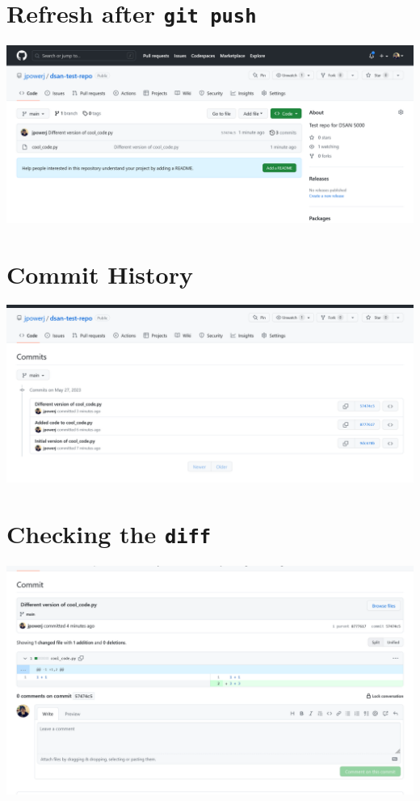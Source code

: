 \documentclass[
  letterpaper,
  DIV=11,
  numbers=noendperiod,
  oneside]{scrreprt}
\begin{document}
\hypertarget{refresh-after-git-push}{%
\section{\texorpdfstring{Refresh after
\texttt{git\ push}}{Refresh after git push}}\label{refresh-after-git-push}}

\includegraphics{assets/img/ch00/github_push.png}

\hypertarget{commit-history}{%
\section{Commit History}\label{commit-history}}

\includegraphics{assets/img/ch00/gh_history.png}

\hypertarget{checking-the-diff}{%
\section{\texorpdfstring{Checking the
\texttt{diff}}{Checking the diff}}\label{checking-the-diff}}

\includegraphics{assets/img/ch00/gh_diff.png}
\end{document}
